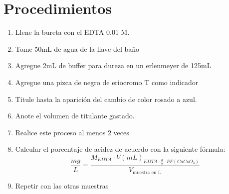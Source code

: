 \begin{table}[H]
\end{table}

\section{Procedimientos}
\begin{enumerate}
    \item Llene la bureta con el EDTA 0.01 M.
    \item Tome 50mL de agua de la llave del baño
    \item Agregue 2mL de buffer para dureza en un erlenmeyer de 125mL
    \item Agregue una pizca de negro de eriocromo T como indicador
    \item Titule hasta la aparición del cambio de color rosado a azul.
    \item Anote el volumen de titulante gastado.
    \item Realice este proceso al menos 2 veces
    \item Calcular el porcentaje de acidez de acuerdo con la siguiente fórmula:
    \begin{equation*}
        \frac{mg}{L} = \frac{ M_{EDTA} \cdot V(mL)_{EDTA \cdot \frac{a}{b} \cdot PF(CaCoO_{3}) } }{ V_{\text{muestra en L}} }
    \end{equation*}
    
    \item Repetir con las otras muestras 
\end{enumerate}